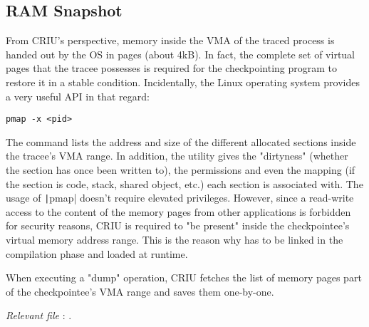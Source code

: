 \subsection*{RAM Snapshot}
From CRIU's perspective, memory inside the \gls{VMA} of the traced process is handed out by the OS in pages (about 4kB). In fact, the complete set of virtual pages that the tracee possesses is required for the checkpointing program to restore it in a stable condition. Incidentally, the Linux operating system provides a very useful API in that regard:
\begin{verbatim}
pmap -x <pid>
\end{verbatim}
The command lists the address and size of the different allocated sections inside the tracee's \gls{VMA} range. In addition, the utility gives the "dirtyness"  (whether the section has once been written to), the permissions and even the mapping (if the section is code, stack, shared object, etc.) each section is associated with. The usage of \texttt|pmap| doesn't require elevated privileges. However, since a read-write access to the content of the memory pages from other applications is forbidden for security reasons, CRIU is required to "be present" inside the checkpointee's virtual memory address range. This is the reason why  has to be linked in the compilation phase and loaded at runtime. 

When executing a "dump" operation, CRIU fetches the list of memory pages part of the checkpointee's VMA range and saves them one-by-one. 

\hfill\textit{Relevant file }: .